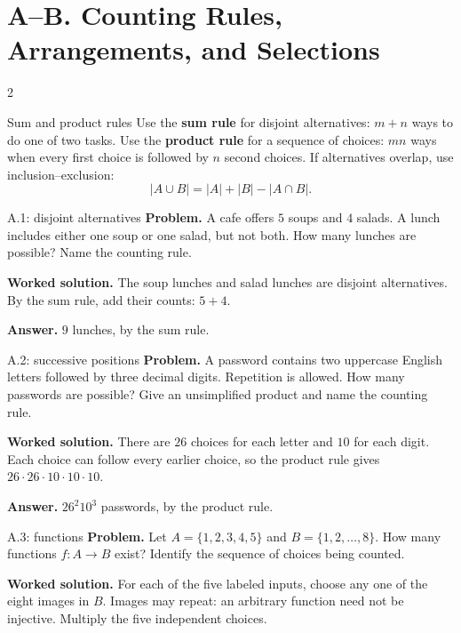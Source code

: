 \documentclass[10pt]{article}
\newcommand{\term}[1]{\textbf{\color{CoreNavy}#1}}
\begin{document}
\small

\section*{A--B. Counting Rules, Arrangements, and Selections}
\begin{multicols}{2}
\begin{definitionbox}{Sum and product rules}
Use the \term{sum rule} for disjoint alternatives: $m+n$ ways to do one of
two tasks. Use the \term{product rule} for a sequence of choices: $mn$ ways
when every first choice is followed by $n$ second choices. If alternatives
overlap, use inclusion--exclusion:
\[
|A\cup B|=|A|+|B|-|A\cap B|.
\]
\end{definitionbox}

\begin{workedbox}{A.1: disjoint alternatives}
\textbf{Problem.} A cafe offers $5$ soups and $4$ salads. A lunch includes either one soup or one salad, but not both. How many lunches are possible? Name the counting rule.

\textbf{Worked solution.} The soup lunches and salad lunches are disjoint alternatives. By the sum rule, add their counts: $5+4$.

\textbf{Answer.} $9$ lunches, by the sum rule.
\end{workedbox}

\begin{workedbox}{A.2: successive positions}
\textbf{Problem.} A password contains two uppercase English letters followed by three decimal digits. Repetition is allowed. How many passwords are possible? Give an unsimplified product and name the counting rule.

\textbf{Worked solution.} There are $26$ choices for each letter and $10$ for each digit. Each choice can follow every earlier choice, so the product rule gives $26\cdot26\cdot10\cdot10\cdot10$.

\textbf{Answer.} $26^2 10^3$ passwords, by the product rule.
\end{workedbox}

\begin{workedbox}{A.3: functions}
\textbf{Problem.} Let $A=\{1,2,3,4,5\}$ and $B=\{1,2,\ldots,8\}$. How many functions $f:A\to B$ exist? Identify the sequence of choices being counted.

\textbf{Worked solution.} For each of the five labeled inputs, choose any one of the eight images in $B$. Images may repeat: an arbitrary function need not be injective. Multiply the five independent choices.


\end{workedbox}
\end{multicols}
\end{document}
